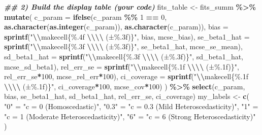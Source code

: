 \documentclass[
  twocolumn]{article}
\newenvironment{Shaded}{\begin{snugshade}}{\end{snugshade}}
\newcommand{\AttributeTok}[1]{\textcolor[rgb]{0.13,0.29,0.53}{#1}}
\newcommand{\DecValTok}[1]{\textcolor[rgb]{0.00,0.00,0.81}{#1}}
\newcommand{\DocumentationTok}[1]{\textcolor[rgb]{0.56,0.35,0.01}{\textbf{\textit{#1}}}}
\newcommand{\FunctionTok}[1]{\textcolor[rgb]{0.13,0.29,0.53}{\textbf{#1}}}
\newcommand{\NormalTok}[1]{#1}
\newcommand{\OtherTok}[1]{\textcolor[rgb]{0.56,0.35,0.01}{#1}}
\newcommand{\SpecialCharTok}[1]{\textcolor[rgb]{0.81,0.36,0.00}{\textbf{#1}}}
\newcommand{\StringTok}[1]{\textcolor[rgb]{0.31,0.60,0.02}{#1}}
\begin{document}
\begin{Shaded}
\begin{Highlighting}[]
\DocumentationTok{\#\# 2) Build the display table (your code)}
\NormalTok{fits\_table }\OtherTok{\textless{}{-}}\NormalTok{ fits\_summ }\SpecialCharTok{\%\textgreater{}\%}
  \FunctionTok{mutate}\NormalTok{(}
    \AttributeTok{c\_param       =} \FunctionTok{ifelse}\NormalTok{(c\_param }\SpecialCharTok{\%\%} \DecValTok{1} \SpecialCharTok{==} \DecValTok{0}\NormalTok{, }
                           \FunctionTok{as.character}\NormalTok{(}\FunctionTok{as.integer}\NormalTok{(c\_param)),}
                           \FunctionTok{as.character}\NormalTok{(c\_param)),}
    \AttributeTok{bias          =} \FunctionTok{sprintf}\NormalTok{(}\StringTok{"}\SpecialCharTok{\textbackslash{}\textbackslash{}}\StringTok{makecell\{\%.4f }\SpecialCharTok{\textbackslash{}\textbackslash{}\textbackslash{}\textbackslash{}}\StringTok{ (±\%.3f)\}"}\NormalTok{, bias, mcse\_bias),}
    \AttributeTok{se\_beta1\_hat  =} \FunctionTok{sprintf}\NormalTok{(}\StringTok{"}\SpecialCharTok{\textbackslash{}\textbackslash{}}\StringTok{makecell\{\%.3f }\SpecialCharTok{\textbackslash{}\textbackslash{}\textbackslash{}\textbackslash{}}\StringTok{ (±\%.3f)\}"}\NormalTok{, se\_beta1\_hat, mcse\_se\_mean),}
    \AttributeTok{sd\_beta1\_hat  =} \FunctionTok{sprintf}\NormalTok{(}\StringTok{"}\SpecialCharTok{\textbackslash{}\textbackslash{}}\StringTok{makecell\{\%.3f }\SpecialCharTok{\textbackslash{}\textbackslash{}\textbackslash{}\textbackslash{}}\StringTok{ (±\%.3f)\}"}\NormalTok{, sd\_beta1\_hat, mcse\_sd\_beta1),}
    \AttributeTok{rel\_err\_se    =} \FunctionTok{sprintf}\NormalTok{(}\StringTok{"}\SpecialCharTok{\textbackslash{}\textbackslash{}}\StringTok{makecell\{\%.1f }\SpecialCharTok{\textbackslash{}\textbackslash{}\textbackslash{}\textbackslash{}}\StringTok{ (±\%.1f)\}"}\NormalTok{, rel\_err\_se}\SpecialCharTok{*}\DecValTok{100}\NormalTok{, mcse\_rel\_err}\SpecialCharTok{*}\DecValTok{100}\NormalTok{),}
    \AttributeTok{ci\_coverage   =} \FunctionTok{sprintf}\NormalTok{(}\StringTok{"}\SpecialCharTok{\textbackslash{}\textbackslash{}}\StringTok{makecell\{\%.1f }\SpecialCharTok{\textbackslash{}\textbackslash{}\textbackslash{}\textbackslash{}}\StringTok{ (±\%.1f)\}"}\NormalTok{, ci\_coverage}\SpecialCharTok{*}\DecValTok{100}\NormalTok{, mcse\_cov}\SpecialCharTok{*}\DecValTok{100}\NormalTok{)}
\NormalTok{  ) }\SpecialCharTok{\%\textgreater{}\%}
  \FunctionTok{select}\NormalTok{(c\_param, bias, se\_beta1\_hat, sd\_beta1\_hat, rel\_err\_se, ci\_coverage)}
\NormalTok{my\_labels }\OtherTok{\textless{}{-}} \FunctionTok{c}\NormalTok{(}
  \StringTok{"0"} \OtherTok{=} \StringTok{"c = 0 (Homoscedastic)"}\NormalTok{,}
  \StringTok{"0.3"} \OtherTok{=} \StringTok{"c = 0.3 (Mild Heteroscedasticity)"}\NormalTok{,}
  \StringTok{"1"} \OtherTok{=} \StringTok{"c = 1 (Moderate Heteroscedasticity)"}\NormalTok{,}
  \StringTok{"6"} \OtherTok{=} \StringTok{"c = 6 (Strong Heteroscedasticity)"}
\NormalTok{)}


\end{Highlighting}
\end{Shaded}
\end{document}
